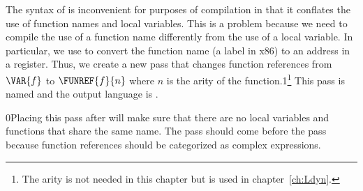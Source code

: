 \documentclass[7x10]{TimesAPriori_MIT}%
\newcommand{\gray}[1]{{\color{gray} #1}}
\def\racketEd{0}
\def\pythonEd{1}
\def\edition{1}
\newcommand{\racket}[1]{{\if\edition\racketEd{#1}\fi}}
\newcommand{\pythonColor}[0]{}
\newcommand{\python}[1]{{\if\edition\pythonEd\pythonColor #1\fi}}
\numberwithin{theorem}{chapter}
\numberwithin{definition}{chapter}
\numberwithin{equation}{chapter}
\begin{document}
The syntax of \LangFun{} is inconvenient for purposes of compilation
in that it conflates the use of function names and local
variables. This is a problem because we need to compile the use of a
function name differently from the use of a local variable.  In
particular, we use  to convert the function name (a label
in x86) to an address in a register.  Thus, we create a new pass that
changes function references from $\VAR{f}$ to $\FUNREF{f}{n}$ where
$n$ is the arity of the function.\python{\footnote{The arity is not
    needed in this chapter but is used in chapter~\ref{ch:Ldyn}.}}
This pass is named  and the output language
is \LangFunRef{}.




\racket{Placing this pass after  will make sure that
  there are no local variables and functions that share the same
  name.}
%
The  pass should come before the
 pass because function references
should be categorized as complex expressions.
\end{document}
